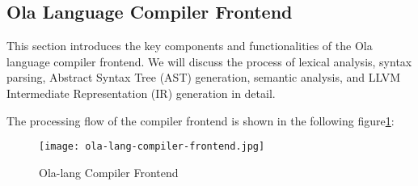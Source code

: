 \subsection{Ola Language Compiler Frontend}

This section introduces the key components and functionalities of the Ola language compiler frontend. We will discuss the process of lexical analysis, syntax parsing, Abstract Syntax Tree (AST) generation, semantic analysis, and LLVM Intermediate Representation (IR) generation in detail.

The processing flow of the compiler frontend is shown in the following figure\ref{fig:ola-lang-compiler-frontend}:

\begin{figure}[!ht]
    \centering
    \texttt{[image: ola-lang-compiler-frontend.jpg]}
    \caption{Ola-lang Compiler Frontend}
    \label{fig:ola-lang-compiler-frontend}
\end{figure}






